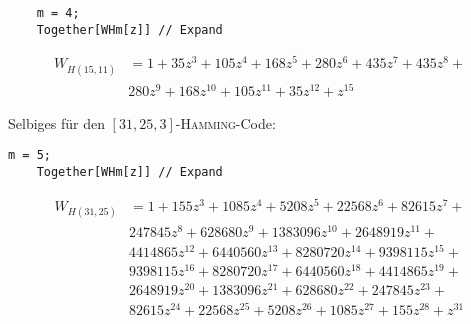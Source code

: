 \begin{enumerate}
\begin{lstlisting}
	m = 4;
	Together[WHm[z]] // Expand
	\end{lstlisting}
	\begin{align*}
	W_{H(15,11)} & = 1 + 35 z^3 + 105 z^4 + 168 z^5 + 280 z^6 + 435 z^7 + 435 z^8 + \\
	& 280 z^9 + 168 z^{10} + 105 z^{11} + 35 z^{12} + z^{15}
	\end{align*}

	Selbiges für den $[31,25,3]$-\textsc{Hamming}-Code:
	\begin{lstlisting}[firstnumber=7]
	m = 5;
	Together[WHm[z]] // Expand
	\end{lstlisting}
	\begin{align*}
	W_{H(31,25)} & = 1 + 155 z^3 + 1085 z^4 + 5208 z^5 + 22568 z^6 + 82615 z^7 +  \\
	& 247845 z^8 + 628680 z^9 + 1383096 z^{10} + 2648919 z^{11} + \\
	& 4414865 z^{12} + 6440560 z^{13} + 8280720 z^{14} + 9398115 z^{15} +  \\
	& 9398115 z^{16} + 8280720 z^{17} + 6440560 z^{18} + 4414865 z^{19} +  \\
	& 2648919 z^{20} + 1383096 z^{21} + 628680 z^{22} + 247845 z^{23} +  \\
	& 82615 z^{24} + 22568 z^{25} + 5208 z^{26} + 1085 z^{27} + 155 z^{28} + z^{31}
	\end{align*}
\end{enumerate}
